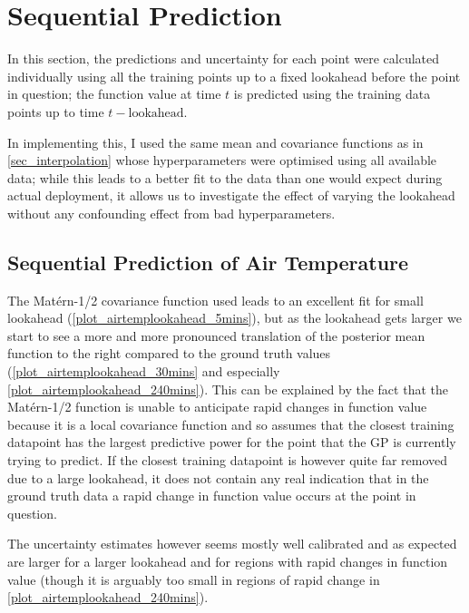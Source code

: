 \documentclass{article}
\begin{document}
    \section{Sequential Prediction}
            
            In this section, the predictions and uncertainty for each point were calculated individually using all the training points up to a fixed lookahead before the point in question; the function value at time $t$ is predicted using the training data points up to time $t-\textrm{lookahead}$.

            In implementing this, I used the same mean and covariance functions as in \cref{sec_interpolation} whose hyperparameters were optimised using all available data; while this leads to a better fit to the data than one would expect during actual deployment, it allows us to investigate the effect of varying the lookahead without any confounding effect from bad hyperparameters.

            \subsection{Sequential Prediction of Air Temperature} 

                The Matérn-1/2 covariance function used leads to an excellent fit for small lookahead (\cref{plot_airtemplookahead_5mins}), but as the lookahead gets larger we start to see a more and more pronounced translation of the posterior mean function to the right compared to the ground truth values (\cref{plot_airtemplookahead_30mins} and especially \cref{plot_airtemplookahead_240mins}). This can be explained by the fact that the Matérn-1/2 function is unable to anticipate rapid changes in function value because it is a local covariance function and so assumes that the closest training datapoint has the largest predictive power for the point that the GP is currently trying to predict. If the closest training datapoint is however quite far removed due to a large lookahead, it does not contain any real indication that in the ground truth data a rapid change in function value occurs at the point in question.

                The uncertainty estimates however seems mostly well calibrated and as expected are larger for a larger lookahead and for regions with rapid changes in function value (though it is arguably too small in regions of rapid change in \cref{plot_airtemplookahead_240mins}).
\end{document}
